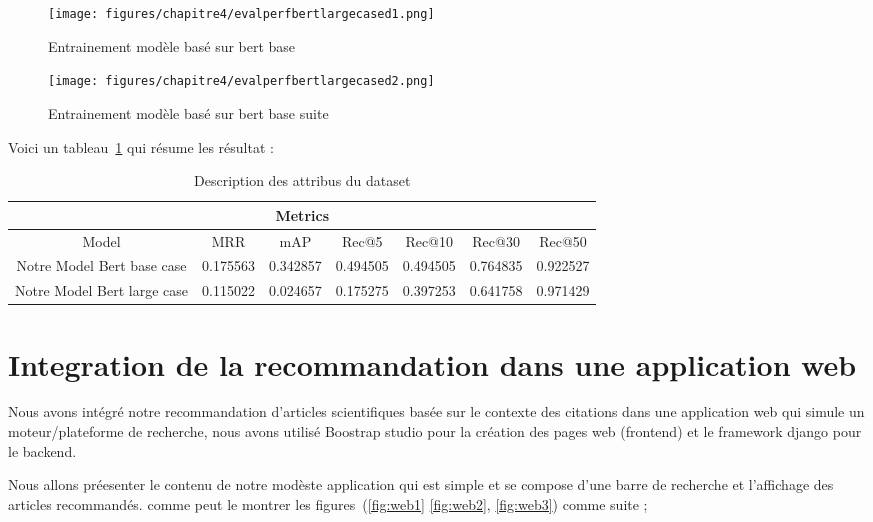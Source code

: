     \begin{figure}[H]
    	\begin{center}
    		\texttt{[image: figures/chapitre4/evalperfbertlargecased1.png]}
    	\end{center}
    	\caption {Entrainement modèle basé sur bert base }
    	\label{fig:base1}
    \end{figure}  
    
    \begin{figure}[H]
    	\begin{center}
    		\texttt{[image: figures/chapitre4/evalperfbertlargecased2.png]}
    	\end{center}
    	\caption {Entrainement modèle basé sur bert base suite}
    	\label{fig:base2}
    \end{figure} 
    

\par Voici un tableau~\ref{table:metrics} qui résume les résultat : 
\begin{table}[H]
    \centering
        \begin{tabular}{ | c | c | c | c | c | c | c | } 
    \hline
    \multicolumn{7}{|c|}{ Metrics } \\
    \hline\hline
    Model & MRR & mAP & Rec@5 & Rec@10 & Rec@30 & Rec@50 \\
    \hline
    Notre Model Bert base  case & 0.175563 & 0.342857 & 0.494505 & 0.494505  & 0.764835 & 0.922527 \\
    \hline
    Notre Model Bert large case & 0.115022 & 0.024657 & 0.175275 & 0.397253 & 0.641758  & 0.971429  \\
    \hline
    \end{tabular}
    \caption{Description des attribus du dataset}
    \label{table:metrics}
\end{table}


\section{Integration de la recommandation dans une application web}
\par Nous avons intégré notre recommandation d'articles scientifiques basée sur le contexte des citations dans une application web qui simule un moteur/plateforme de recherche, nous avons utilisé Boostrap studio pour la création des pages web (frontend) et le framework django pour le backend.

\par Nous allons préesenter le contenu de notre modèste application qui est simple et se compose d'une barre de recherche et l'affichage des articles recommandés. comme peut le montrer les figures~(\ref{fig:web1} \ref{fig:web2}, \ref{fig:web3}) comme suite ;

